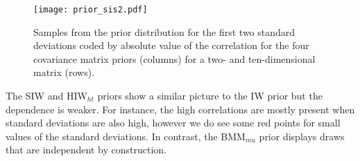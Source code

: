 \documentclass[12pt]{article}
\begin{document}
\begin{figure}[htbp]
\begin{center}
 \texttt{[image: prior\_sis2.pdf]} 
  \vspace{-.5in}
\caption{Samples from the prior distribution for the first two standard deviations coded by absolute value of the correlation for the four covariance matrix priors (columns) for a two- and ten-dimensional matrix (rows).}
\label{priorF2} 
\end{center}
\end{figure}

The SIW and HIW$_{ht}$ priors show a similar picture to the IW prior but the dependence is weaker. For instance, the high correlations are mostly present when standard deviations are also high, however we do see some red points for small values of the standard deviations. In contrast, the BMM$_{mu}$ prior displays draws that are independent by construction. 

\end{document}
